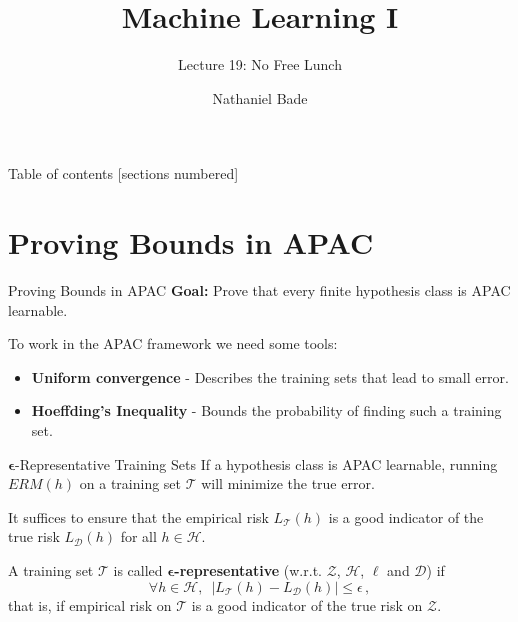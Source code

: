 \documentclass[10pt, table, dvipsnames,handout]{beamer}
\title{Machine Learning I}
\subtitle{Lecture 19: No Free Lunch}
\date{}
\author{Nathaniel Bade}
\institute{Northeastern University Department of Mathematics}
\newcommand{\cT}{\ensuremath{\mathcal{T}}}
\newcommand{\cD}{\ensuremath{\mathcal{D}}}
\newcommand{\cZ}{\ensuremath{\mathcal{Z}}}
\newcommand{\cH}{\ensuremath{\mathcal{H}}}
\begin{document}
\maketitle

\begin{frame}{Table of contents}
  [sections numbered]
  \tableofcontents[hideallsubsections]
\end{frame}






\section{Proving Bounds in APAC}

\begin{frame}[fragile]{Proving Bounds in APAC}
\textbf{Goal:} Prove that every finite hypothesis class is APAC learnable. \newline\pause

To work in the APAC framework we need some tools: 

\begin{itemize}
\item[] \textbf{Uniform convergence} - Describes the training sets that lead to small error. 
\item[] \textbf{Hoeffding's Inequality} - Bounds the probability of finding such a training set. 
\end{itemize}


\end{frame}




\begin{frame}[fragile]{$\mathbf{\epsilon}$-Representative Training Sets}
If a hypothesis class is APAC learnable, running $ERM(h)$ on a training set $\mathcal{T}$ will minimize the true error.\newline

It suffices to ensure that the empirical risk $L_\cT(h)$ is a good indicator of the true risk $L_\cD(h)$ for all $h\in \cH$. \pause

A training set $\mathcal{T}$ is called \textbf{$\mathbf{\epsilon}$-representative} (w.r.t. $\cZ$, $\cH$, $\ell$ and $\cD$) if
$$
\forall h\in \mathcal{H},\,\,\, |L_\cT(h) - L_\cD(h)|\leq \epsilon\,,
$$\pause
that is, if empirical risk on $\cT$ is a good indicator of the true risk on $\cZ$. 

\end{frame}
\end{document}
